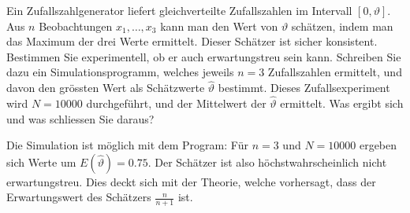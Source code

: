 Ein Zufallszahlgenerator liefert gleichverteilte Zufallszahlen im
Intervall $[0,\vartheta]$. Aus $n$ Beobachtungen $x_1,\dots,x_3$ kann
man den Wert von $\vartheta$ schätzen, indem man das Maximum der
drei Werte ermittelt. Dieser Schätzer ist sicher konsistent.
Bestimmen Sie experimentell, ob er auch erwartungstreu sein kann.
Schreiben Sie dazu ein Simulationsprogramm, welches jeweils $n=3$
Zufallszahlen ermittelt, und davon den grössten Wert als
Schätzwerte $\hat\vartheta$ bestimmt.
Dieses Zufallsexperiment wird $N=10000$ durchgeführt, und der Mittelwert
der $\hat\vartheta$ ermittelt. Was ergibt sich und was schliessen Sie
daraus?

\begin{loesung}
Die Simulation ist möglich mit dem Program:
{\small
{}
}
Für $n=3$ und $N=10000$ ergeben sich Werte  um $E(\hat\vartheta)=0.75$.
Der Schätzer ist also höchstwahrscheinlich nicht erwartungstreu.
Dies deckt sich mit der Theorie, welche vorhersagt, dass der Erwartungswert
des Schätzers $\frac{n}{n+1}$ ist.
\end{loesung}

